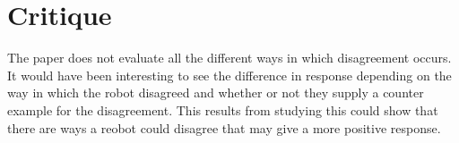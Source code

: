\documentclass{article}
\begin{document}
\section*{Critique}
The paper does not evaluate all the different ways in which disagreement occurs. It would have been interesting to see the difference in response depending on the way in which the robot disagreed and whether or not they supply a counter example for the disagreement. This results from studying this could show that there are ways a reobot could disagree that may give a more positive response.
\cite{Takayama:2009:ISD:1518701.1519021}
\end{document}
